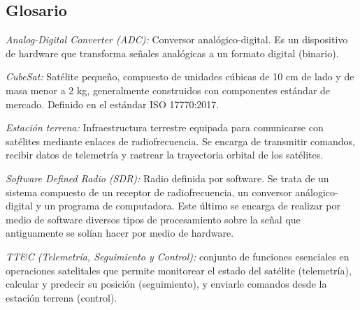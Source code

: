 \subsection{Glosario}
\textit{Analog-Digital Converter (ADC):} Conversor analógico-digital. Es un dispositivo de hardware que transforma señales analógicas a un formato digital (binario).

\textit{CubeSat:} Satélite pequeño, compuesto de unidades cúbicas de 10 cm de lado y de masa menor a 2 kg, generalmente construidos con componentes estándar de mercado. Definido en el estándar ISO 17770:2017.


\textit{Estación terrena:} Infraestructura terrestre equipada para comunicarse con satélites mediante enlaces de radiofrecuencia. Se encarga de transmitir comandos, recibir datos de telemetría y rastrear la trayectoria orbital de los satélites.



\textit{Software Defined Radio (SDR):} Radio definida por software. Se trata de un sistema compuesto de un receptor de radiofrecuencia, un conversor análogico-digital y un programa de computadora. Este último se encarga de realizar por medio de software diversos tipos de procesamiento sobre la señal que antiguamente se solían hacer por medio de hardware.

\textit{TT\&C (Telemetría, Seguimiento y Control):} conjunto de funciones esenciales en operaciones satelitales que permite monitorear el estado del satélite (telemetría), calcular y predecir su posición (seguimiento), y enviarle comandos desde la estación terrena (control).



